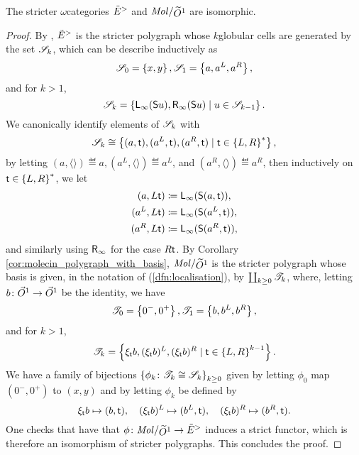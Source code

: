 \begin{lem} \label{lem:swE_is_iso_to_molecin_loc_globe}
    The stricter \( \omega \)\nbd categories \( \tilde E^> \) and \( \molecin{\rglobe{1}} \) are isomorphic.
\end{lem}
\begin{proof}
    By \cite[Remark 1.29]{hadzihasanovic2024model}, \( \tilde E^> \) is the stricter polygraph whose \( k \)\nbd globular cells are
    generated by the set \( \mathscr{S}_k \), which can be describe inductively as
    \begin{equation*}
        \mathscr{S}_0 = \left\{ {x, y} \right\}, \mathscr{S}_1 = \left\{ {a, a^L, a^R} \right\},
    \end{equation*} 
    and for \( k > 1 \),
    \begin{equation*}
        \mathscr{S}_k = \left\{ {\mathsf{L}_\infty(\mathsf{S}{u}), \mathsf{R}_\infty(\mathsf{S}{u}) \mid u \in \mathscr{S}_{k - 1}} \right\}.
    \end{equation*}
    We canonically identify elements of \( \mathscr{S}_k \) with
    \begin{equation*}
        \mathscr{S}_k \cong \left\{ {(a, \mathsf{t}), (a^L, \mathsf{t}), (a^R, \mathsf{t}) \mid \mathsf{t} \in \left\{ {L, R} \right\}^*} \right\},
    \end{equation*}
    by letting \( (a, \langle\rangle) \eqdef a, (a^L, \langle\rangle) \eqdef a^L \), and \( (a^R, \langle\rangle) \eqdef a^R \), then inductively on \( \mathsf{t} \in \left\{ {L, R} \right\}^* \), we let 
    \begin{align*}
        (a, L\mathsf{t})   & \coloneqq \mathsf{L}_\infty(\mathsf{S}{(a, \mathsf{t})}),  \\
        (a^L, L\mathsf{t}) & \coloneqq \mathsf{L}_\infty(\mathsf{S}{(a^L, \mathsf{t})}), \\
        (a^R, L\mathsf{t}) & \coloneqq \mathsf{L}_\infty(\mathsf{S}{(a^R, \mathsf{t})}),
    \end{align*}
    and similarly using \( \mathsf{R}_\infty \) for the case \( R\mathsf{t} \).    
    By Corollary \ref{cor:molecin_polygraph_with_basis}, \( \molecin{\rglobe{1}} \) is the stricter polygraph whose basis is given, in the notation of (\ref{dfn:localisation}), by \( \coprod_{k \geq 0} \mathscr{T}_k \), where, letting \( b \colon \vec{O}^{1} \to \vec{O}^{1} \) be the identity, we have
    \begin{equation*}
        \mathscr{T}_0 = \left\{ {0^-, 0^+} \right\}, \mathscr{T}_1 = \left\{ {b, b^L, b^R} \right\},
    \end{equation*}
    and for \( k > 1 \),
    \begin{equation*}
        \mathscr{T}_k = \left\{ {\xi_{\mathsf{t}}b, (\xi_{\mathsf{t}}b)^L, (\xi_{\mathsf{t}}b)^R \mid \mathsf{t} \in \left\{ {L, R} \right\}^{k - 1}} \right\}.
    \end{equation*}
    We have a family of bijections \( \left\{ {\phi_k \colon \mathscr{T}_k \cong \mathscr{S}_k} \right\}_{k \geq 0} \) given by letting \( \phi_0 \) map \( (0^-, 0^+) \) to \( (x, y) \) and by letting \( \phi_k \) be defined by
    \begin{equation*}
        \xi_{\mathsf{t}}b \mapsto (b, \mathsf{t}),\quad (\xi_{\mathsf{t}}b)^L \mapsto (b^L, \mathsf{t}),\quad (\xi_{\mathsf{t}}b)^R \mapsto (b^R, \mathsf{t}).
    \end{equation*}
    One checks that have that \( \phi \colon \molecin{\rglobe{1}} \to \swE \) induces a strict functor, which is therefore an isomorphism of stricter polygraphs.
    This concludes the proof.
\end{proof}


